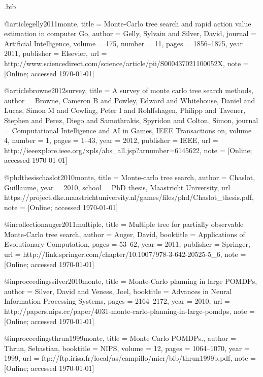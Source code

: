 \begin{filecontents*}{\jobname.bib}

@article{gelly2011monte,
	title		= {{M}onte-{C}arlo tree search and rapid action value estimation in computer {G}o},
	author	= {Gelly, Sylvain and Silver, David},
	journal	= {Artificial Intelligence},
	volume	= {175},
	number	= {11},
	pages		= {1856--1875},
	year		= {2011},
	publisher	= {Elsevier},
	url 		= {http://www.sciencedirect.com/science/article/pii/S000437021100052X},
	note		= {[Online; accessed \today]}
}

@article{browne2012survey,
	title 		= {{A} survey of monte carlo tree search methods},
	author 	= {Browne, Cameron B and Powley, Edward and Whitehouse, Daniel and Lucas, Simon M and Cowling, Peter I and Rohlfshagen, Philipp and Tavener, Stephen and Perez, Diego and Samothrakis, Spyridon and Colton, Simon},
	journal 	= {Computational Intelligence and AI in Games, IEEE Transactions on},
	volume 	= {4},
	number 	= {1},
	pages 	= {1--43},
	year 		= {2012},
	publisher 	= {IEEE},
	url 		= {http://ieeexplore.ieee.org/xpls/abs\_all.jsp?arnumber=6145622},
	note		= {[Online; accessed \today]}
}

@phdthesis{chaslot2010monte,
	title		= {Monte-carlo tree search},
	author	= {Chaslot, Guillaume},
	year		= {2010},
	school		= {PhD thesis, Maastricht University},
	url 		= {https://project.dke.maastrichtuniversity.nl/games/files/phd/Chaslot\_thesis.pdf},
	note		= {[Online; accessed \today]}
}

@incollection{auger2011multiple,
	title		= {{M}ultiple tree for partially observable {M}onte-{C}arlo tree search},
	author	= {Auger, David},
	booktitle	= {Applications of Evolutionary Computation},
	pages		= {53--62},
	year		= {2011},
	publisher	= {Springer},
	url 		= {http://link.springer.com/chapter/10.1007/978-3-642-20525-5\_6},
	note		= {[Online; accessed \today]}
}

@inproceedings{silver2010monte,
	title		= {{M}onte-{C}arlo planning in large {POMDP}s},
	author		= {Silver, David and Veness, Joel},
	booktitle	= {Advances in Neural Information Processing Systems},
	pages		= {2164--2172},
	year		= {2010},
	url 		= {http://papers.nips.cc/paper/4031-monte-carlo-planning-in-large-pomdps},
	note		= {[Online; accessed \today]}
}

@inproceedings{thrun1999monte,
	title		= {{M}onte {C}arlo {POMDP}s.},
	author	= {Thrun, Sebastian},
	booktitle	= {NIPS},
	volume	= {12},
	pages		= {1064--1070},
	year		= {1999},
	url 		= {ftp://ftp.irisa.fr/local/as/campillo/micr/bib/thrun1999b.pdf},
	note		= {[Online; accessed \today]}
}


\end{filecontents*}
